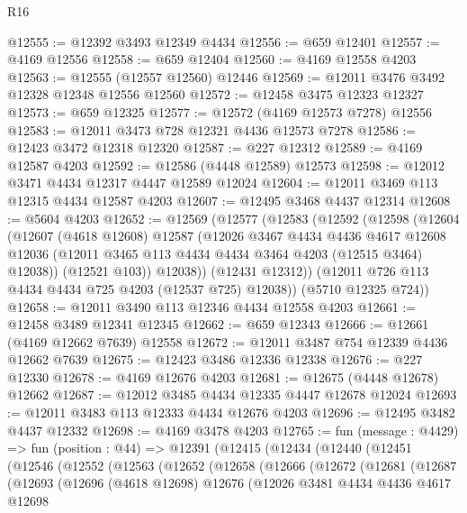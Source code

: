 \begin{lexlean}{R16}
\begin{coremodule}
@12555 := @12392 @3493 @12349 @4434
@12556 := @659 @12401
@12557 := @4169 @12556
@12558 := @659 @12404
@12560 := @4169 @12558 @4203
@12563 := @12555 (@12557 @12560) @12446
@12569 := @12011 @3476 @3492 @12328 @12348 @12556 @12560
@12572 := @12458 @3475 @12323 @12327
@12573 := @659 @12325
@12577 := @12572 (@4169 @12573 @7278) @12556
@12583 := @12011 @3473 @728 @12321 @4436 @12573 @7278
@12586 := @12423 @3472 @12318 @12320
@12587 := @227 @12312
@12589 := @4169 @12587 @4203
@12592 := @12586 (@4448 @12589) @12573
@12598 := @12012 @3471 @4434 @12317 @4447 @12589 @12024
@12604 := @12011 @3469 @113 @12315 @4434 @12587 @4203
@12607 := @12495 @3468 @4437 @12314
@12608 := @5604 @4203
@12652 := @12569
    (@12577
      (@12583
        (@12592
          (@12598
            (@12604
              (@12607
                (@4618 @12608)
                @12587
                (@12026
                  @3467
                  @4434
                  @4436
                  @4617
                  @12608
                  @12036
                  (@12011 @3465 @113 @4434 @4434 @3464 @4203 (@12515 @3464) @12038))
                (@12521 @103))
              @12038))
          (@12431 @12312))
        (@12011 @726 @113 @4434 @4434 @725 @4203 (@12537 @725) @12038))
      (@5710 @12325 @724))
@12658 := @12011 @3490 @113 @12346 @4434 @12558 @4203
@12661 := @12458 @3489 @12341 @12345
@12662 := @659 @12343
@12666 := @12661 (@4169 @12662 @7639) @12558
@12672 := @12011 @3487 @754 @12339 @4436 @12662 @7639
@12675 := @12423 @3486 @12336 @12338
@12676 := @227 @12330
@12678 := @4169 @12676 @4203
@12681 := @12675 (@4448 @12678) @12662
@12687 := @12012 @3485 @4434 @12335 @4447 @12678 @12024
@12693 := @12011 @3483 @113 @12333 @4434 @12676 @4203
@12696 := @12495 @3482 @4437 @12332
@12698 := @4169 @3478 @4203
@12765 := fun (message : @4429) =>
  fun (position : @44) =>
  @12391
    (@12415
      (@12434
        (@12440
          (@12451
            (@12546
              (@12552
                (@12563
                  (@12652
                    (@12658
                      (@12666
                        (@12672
                          (@12681
                            (@12687
                              (@12693
                                (@12696
                                  (@4618 @12698)
                                  @12676
                                  (@12026
                                    @3481
                                    @4434
                                    @4436
                                    @4617
                                    @12698

\end{coremodule}
\end{lexlean}
